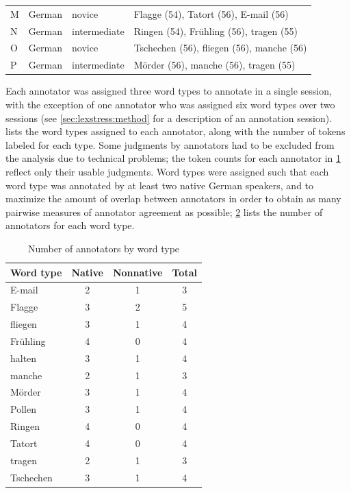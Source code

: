 \begin{table}[htb]
\begin{tabularx}{\textwidth}{lllX}
		M & German	 & novice & Flagge (54), \TODO{mention?}  Tatort (56),  E-mail (56) 	 \\
		
		N & 	German	 & intermediate & Ringen (54), \TODO{mention?}  Fr\"{u}hling (56), tragen (55)	 \\
		
		O & German	& novice & Tschechen (56),  fliegen (56),  manche (56)	 \\
		
		P	& German	 & intermediate & Mörder (56),   manche (56),  tragen (55) \\
		
		\bottomrule
		\end{tabularx}
		\label{tab:annotators}
	\end{table}
	
	Each annotator was assigned three word types to annotate in a single session, with the exception of one annotator who was assigned six word types over two sessions (see \cref{sec:lexstress:method} for a description of an annotation session).  lists the word types assigned to each annotator, along with the number of tokens labeled for each type. Some judgments by annotators  had to be excluded from the analysis due to technical problems; the token counts for each annotator in \cref{tab:annotators} reflect only their usable judgments.  Word types were assigned such that each word type was annotated by at least two native German speakers, and to maximize the amount of overlap between annotators in order to obtain as many pairwise measures of annotator agreement as possible; \cref{tab:annotatorsbyword} lists the number of annotators for each word type.
	
	
	\begin{table}[htb]
		\centering
		\caption{Number of annotators by word type}
		\begin{tabular}{lccc}
		\toprule
		Word type 
		&		Native %
		& 	Nonnative %
		& Total %
		\\
		\midrule
		E-mail	& 2 &	1 &	3 \\
		Flagge	& 3	& 2	& 5 \\
		fliegen	& 3	& 1	& 4 \\
		Frühling	& 4	& 0	& 4 \\
		halten	& 3	& 1	& 4 \\
		manche	& 2	& 1	& 3 \\
		Mörder & 	3	& 1	& 4 \\
		Pollen	& 3	& 1	& 4 \\
		Ringen	& 4	& 0	& 4 \\
		Tatort	& 4	& 0	& 4 \\
		tragen	& 2	& 1	& 3 \\
		Tschechen 	& 3	& 1	& 4 \\
		\bottomrule
		\end{tabular}
		\label{tab:annotatorsbyword}
	\end{table}
	
